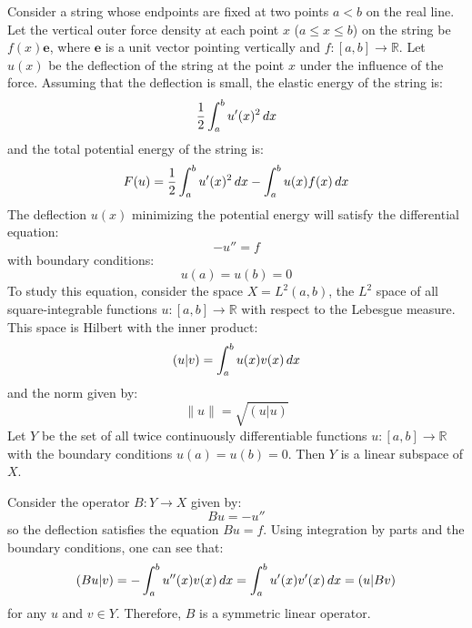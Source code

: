 \documentclass{article}
\begin{document}
Consider a string whose endpoints are fixed at two points $a < b$ on the real
line. Let the vertical outer force density at each point $x$ ($a \le x \le b$)
on the string be $f (x) \mathbf{e}$, where $\mathbf{e}$ is a unit vector
pointing vertically and $f : [a, b] \to \mathbb{R}$. Let $u (x)$ be the
deflection of the string at the point $x$ under the influence of the force.
Assuming that the deflection is small, the elastic energy of the string is:
\begin{equation}
  \frac{1}{2}  \int_a^b u' (x)^2  \hspace{0.17em} dx
\end{equation}
and the total potential energy of the string is:
\begin{equation}
  F (u) = \frac{1}{2}  \int_a^b u' (x)^2  \hspace{0.17em} dx - \int_a^b u (x)
  f (x)  \hspace{0.17em} dx
\end{equation}
The deflection $u (x)$ minimizing the potential energy will satisfy the
differential equation:
\begin{equation}
  - u'' = f
\end{equation}
with boundary conditions:
\begin{equation}
  u (a) = u (b) = 0
\end{equation}
To study this equation, consider the space $X = L^2 (a, b)$, the $L^2$ space
of all square-integrable functions $u : [a, b] \to \mathbb{R}$ with respect to
the Lebesgue measure. This space is Hilbert with the inner product:
\begin{equation}
  (u|v) = \int_a^b u (x) v (x)  \hspace{0.17em} dx
\end{equation}
and the norm given by:
\begin{equation}
  \|u\| = \sqrt{(u|u)}
\end{equation}
Let $Y$ be the set of all twice continuously differentiable functions $u : [a,
b] \to \mathbb{R}$ with the boundary conditions $u (a) = u (b) = 0$. Then $Y$
is a linear subspace of $X$.

Consider the operator $B : Y \to X$ given by:
\begin{equation}
  Bu = - u''
\end{equation}
so the deflection satisfies the equation $Bu = f$. Using integration by parts
and the boundary conditions, one can see that:
\begin{equation}
  (Bu|v) = - \int_a^b u'' (x) v (x)  \hspace{0.17em} dx = \int_a^b u' (x) v'
  (x)  \hspace{0.17em} dx = (u|Bv)
\end{equation}
for any $u$ and $v \in Y$. Therefore, $B$ is a symmetric linear operator.
\end{document}

